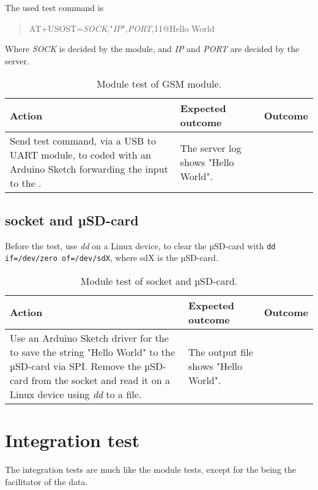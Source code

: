 The used test command is
\begin{quote}
	AT+USOST=\textit{SOCK},"\textit{IP}",\textit{PORT},11@Hello World
\end{quote}
Where \textit{SOCK} is decided by the \SARA module, and \textit{IP} and \textit{PORT} are decided by the server.

\begin{table}[H]
	\centering
	\begin{tabularx}{\textwidth}{p{4.3cm} X X}
		\toprule
		\textbf{Action} & \textbf{Expected outcome} & \textbf{Outcome} \\
		\midrule
		Send test command, via a USB to UART module, to \MKR coded with an Arduino Sketch forwarding the input to the \SARA. & The server log shows "Hello World". & \\
		\bottomrule
	\end{tabularx}
	\caption{Module test of \SARA GSM module.}
	\label{AT:modGSM}
\end{table}

\subsection{\SDsock socket and µSD-card}
Before the test, use \textit{dd} on a Linux device, to clear the µSD-card with \texttt{dd if=/dev/zero of=/dev/sdX}, where sdX is the µSD-card.

\begin{table}[H]
	\centering
	\begin{tabularx}{\textwidth}{p{4.3cm} X X}
		\toprule
		\textbf{Action} & \textbf{Expected outcome} & \textbf{Outcome} \\
		\midrule
		Use an Arduino Sketch driver for the \MKR to save the string "Hello World" to the µSD-card via SPI.
		Remove the µSD-card from the \SDsock socket and read it on a Linux device using \textit{dd} to a file. & The output file shows "Hello World". & \\
		\bottomrule
	\end{tabularx}
	\caption{Module test of \SDsock socket and µSD-card.}
	\label{AT:modSD}
\end{table}

\section{Integration test}
The integration tests are much like the module tests, except for the \MKR being the facilitator of the data.

